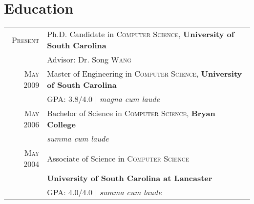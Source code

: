 \documentclass[a4paper,10pt]{article}
\begin{document}
\vspace{2em}

\section{Education}
\begin{tabular}{r p{12cm}}
  \textsc{Present} & Ph.D. Candidate in \textsc{Computer Science}, \textbf{University of South Carolina}\\
  &%
  \small Advisor: Dr. Song \textsc{Wang} %
  \\%
  \textsc{May} 2009 & Master of Engineering in \textsc{Computer Science}, \textbf{University of South Carolina}\\
  &\normalsize \textsc{GPA}: 3.8/4.0 | \small\emph{magna cum laude}
\\%
\textsc{May} 2006& Bachelor of Science in \textsc{Computer Science}, \textbf{Bryan College} \\
&\normalsize 
\small\emph{summa cum laude}
\\%
\textsc{May} 2004& Associate of Science in \textsc{Computer Science}\\
&\textbf{University of South Carolina at Lancaster} \\
&\normalsize \textsc{GPA}: 4.0/4.0 | \small\emph{summa cum laude}\\
\end{tabular}

\vspace{2em}

\newcommand{\experience}[4]{
\textsc{#1}
& #2 \\
&\emph{#3}\\
&\footnotesize{#4}
\\\multicolumn{2}{c}{} \\
}
\end{document}
